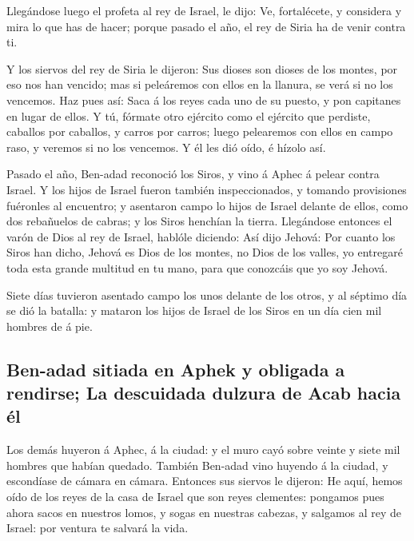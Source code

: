  Llegándose luego el profeta al rey de Israel, le dijo:
Ve, fortalécete, y considera y mira lo que has de hacer; porque pasado
el año, el rey de Siria ha de venir contra ti.

 Y los siervos del rey de Siria le dijeron: Sus dioses
son dioses de los montes, por eso nos han vencido; mas si peleáremos con
ellos en la llanura, se verá si no los vencemos.  Haz
pues así: Saca á los reyes cada uno de su puesto, y pon capitanes en
lugar de ellos.  Y tú, fórmate otro ejército como el
ejército que perdiste, caballos por caballos, y carros por carros; luego
pelearemos con ellos en campo raso, y veremos si no los vencemos. Y él
les dió oído, é hízolo así.

 Pasado el año, Ben-adad reconoció los Siros, y vino á
Aphec á pelear contra Israel.  Y los hijos de Israel
fueron también inspeccionados, y tomando provisiones fuéronles al
encuentro; y asentaron campo lo hijos de Israel delante de ellos, como
dos rebañuelos de cabras; y los Siros henchían la tierra.
 Llegándose entonces el varón de Dios al rey de Israel,
hablóle diciendo: Así dijo Jehová: Por cuanto los Siros han dicho,
Jehová es Dios de los montes, no Dios de los valles, yo entregaré toda
esta grande multitud en tu mano, para que conozcáis que yo soy Jehová.

 Siete días tuvieron asentado campo los unos delante de
los otros, y al séptimo día se dió la batalla: y mataron los hijos de
Israel de los Siros en un día cien mil hombres de á pie.

\hypertarget{ben-adad-sitiada-en-aphek-y-obligada-a-rendirse-la-descuidada-dulzura-de-acab-hacia-uxe9l}{%
\subsection{Ben-adad sitiada en Aphek y obligada a rendirse; La
descuidada dulzura de Acab hacia
él}\label{ben-adad-sitiada-en-aphek-y-obligada-a-rendirse-la-descuidada-dulzura-de-acab-hacia-uxe9l}}

 Los demás huyeron á Aphec, á la ciudad: y el muro cayó
sobre veinte y siete mil hombres que habían quedado. También Ben-adad
vino huyendo á la ciudad, y escondíase de cámara en cámara.
 Entonces sus siervos le dijeron: He aquí, hemos oído de
los reyes de la casa de Israel que son reyes clementes: pongamos pues
ahora sacos en nuestros lomos, y sogas en nuestras cabezas, y salgamos
al rey de Israel: por ventura te salvará la vida.

